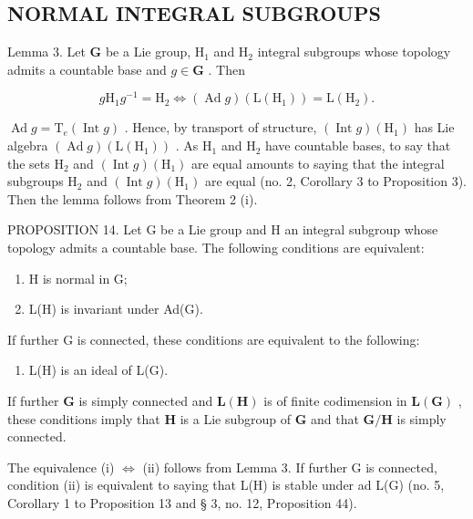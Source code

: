 \subsection{NORMAL INTEGRAL SUBGROUPS}

Lemma 3. Let \(\mathbf{G}\) be a Lie group, \(\mathrm{H}_1\) and \(\mathrm{H}_2\) integral subgroups whose topology admits a countable base and \(g \in \mathbf{G}\) . Then

\[
g \mathrm{H} _ {1} g ^ {- 1} = \mathrm{H} _ {2} \Leftrightarrow (\operatorname{Ad} g) (\mathrm{L} (\mathrm{H} _ {1})) = \mathrm{L} (\mathrm{H} _ {2}).
\]

\(\operatorname{Ad} g = \mathrm{T}_{e}(\operatorname{Int} g)\) . Hence, by transport of structure, \((\operatorname{Int} g)(\mathrm{H}_{1})\) has Lie algebra \((\operatorname{Ad} g)(\mathrm{L}(\mathrm{H}_{1}))\) . As \(\mathrm{H}_{1}\) and \(\mathrm{H}_{2}\) have countable bases, to say that the sets \(\mathrm{H}_{2}\) and \((\operatorname{Int} g)(\mathrm{H}_{1})\) are equal amounts to saying that the integral subgroups \(\mathrm{H}_{2}\) and \((\operatorname{Int} g)(\mathrm{H}_{1})\) are equal (no. 2, Corollary 3 to Proposition 3). Then the lemma follows from Theorem 2 (i).

PROPOSITION 14. Let G be a Lie group and H an integral subgroup whose topology admits a countable base. The following conditions are equivalent:

\begin{enumerate}
\def\labelenumi{(\roman{enumi})}
\item
  H is normal in G;
\item
  L(H) is invariant under Ad(G).
\end{enumerate}

If further G is connected, these conditions are equivalent to the following:

\begin{enumerate}
\def\labelenumi{(\roman{enumi})}
\setcounter{enumi}{2}
\tightlist
\item
  L(H) is an ideal of L(G).
\end{enumerate}

If further \(\mathbf{G}\) is simply connected and \(\mathbf{L}(\mathbf{H})\) is of finite codimension in \(\mathbf{L}(\mathbf{G})\) , these conditions imply that \(\mathbf{H}\) is a Lie subgroup of \(\mathbf{G}\) and that \(\mathbf{G} / \mathbf{H}\) is simply connected.

The equivalence (i) \(\Leftrightarrow\) (ii) follows from Lemma 3. If further G is connected, condition (ii) is equivalent to saying that L(H) is stable under ad L(G) (no. 5, Corollary 1 to Proposition 13 and § 3, no. 12, Proposition 44).

